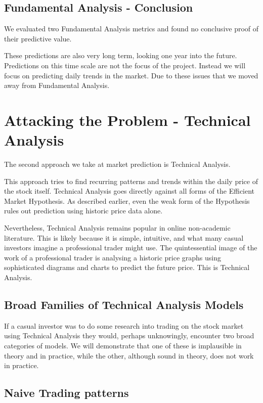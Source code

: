 \documentclass{report}
\begin{document}
\section{Fundamental Analysis - Conclusion}

We evaluated two Fundamental Analysis metrics and found no conclusive proof of their predictive value.  

These predictions are also very long term, looking one year into the future. Predictions on this time scale are not the focus of the project. Instead we will focus on predicting daily trends in the market. Due to these issues that we moved away from Fundamental Analysis.

\chapter{Attacking the Problem - Technical Analysis}

The second approach we take at market prediction is Technical Analysis. 

This approach tries to find recurring patterns and trends within the daily price of the stock itself. Technical Analysis goes directly against all forms of the Efficient Market Hypothesis. As described earlier, even the weak form of the Hypothesis rules out prediction using historic price data alone. 

Nevertheless, Technical Analysis remains popular in online non-academic literature. This is likely because it is simple, intuitive, and what many casual investors imagine a professional trader might use. The quintessential image of the work of a professional trader is analysing a historic price graphs using sophisticated diagrams and charts to predict the future price. This is Technical Analysis.

\section{Broad Families of Technical Analysis Models}

If a casual investor was to do some research into trading on the stock market using Technical Analysis they would, perhaps unknowingly, encounter two broad categories of models. We will demonstrate that one of these is implausible in theory and in practice, while the other, although sound in theory, does not work in practice.

\section{Naive Trading patterns}
\end{document}
